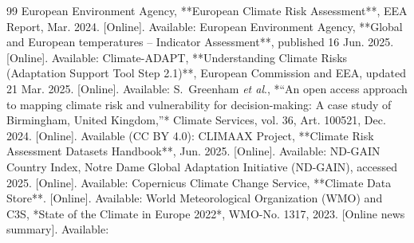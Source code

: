 \documentclass[10pt, conference]{IEEEtran}
\begin{document}
\begin{thebibliography}{99}
 European Environment Agency, **European Climate Risk Assessment**, EEA Report, Mar. 2024. [Online]. Available:  European Environment Agency, **Global and European temperatures – Indicator Assessment**, published 16 Jun. 2025. [Online]. Available:  Climate-ADAPT, **Understanding Climate Risks (Adaptation Support Tool Step 2.1)**, European Commission and EEA, updated 21 Mar. 2025. [Online]. Available:  S.~Greenham \emph{et al}., *“An open access approach to mapping climate risk and vulnerability for decision-making: A case study of Birmingham, United Kingdom,”* Climate Services, vol. 36, Art. 100521, Dec. 2024. [Online]. Available (CC BY 4.0):  CLIMAAX Project, **Climate Risk Assessment Datasets Handbook**, Jun. 2025. [Online]. Available: 
 ND-GAIN Country Index, Notre Dame Global Adaptation Initiative (ND-GAIN), accessed 2025. [Online]. Available: 
 Copernicus Climate Change Service, **Climate Data Store**. [Online]. Available:  World Meteorological Organization (WMO) and C3S, *State of the Climate in Europe 2022*, WMO-No. 1317, 2023. [Online news summary]. Available: \end{thebibliography}
\end{document}

